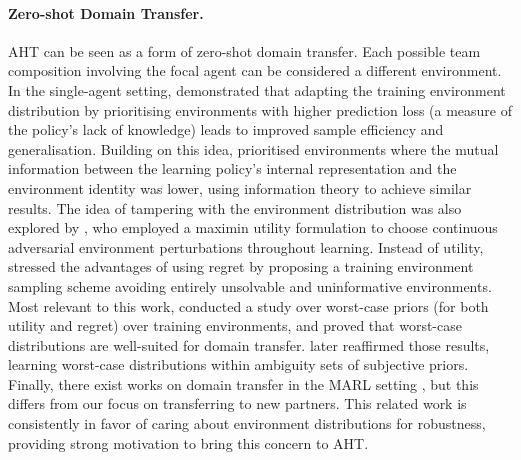 \paragraph{Zero-shot Domain Transfer.}
AHT can be seen as a form of zero-shot domain transfer. Each possible team composition involving the focal agent can be considered a different environment. In the single-agent setting, \citet{jiang_prioritized_level_replay_2021} demonstrated that adapting the training environment distribution by prioritising environments with higher prediction loss (a measure of the policy's lack of knowledge) leads to improved sample efficiency and generalisation. Building on this idea, \citet{garcin_how_level_sampling_2023} prioritised environments where the mutual information between the learning policy's internal representation and the environment identity was lower, using information theory to achieve similar results. The idea of tampering with the environment distribution was also explored by \citet{pinto_robust_adversarial_reinforcement_2017}, who employed a maximin utility formulation to choose continuous adversarial environment perturbations throughout learning. Instead of utility, \citet{dennis_emergent_complexity_zero_2020} stressed the advantages of using regret by proposing a training environment sampling scheme avoiding entirely unsolvable and uninformative environments. Most relevant to this work,  \citet{buening_minimax_bayes_reinforcement_2023} conducted a study over worst-case priors (for both utility and regret) over training environments, and proved that worst-case distributions are well-suited for domain transfer. \citet{li_bayes_optimal_robust_2024} later reaffirmed those results, learning worst-case distributions within ambiguity sets of subjective priors. Finally, there exist works on domain transfer in the MARL setting \citep{schafer_task_generalisation_multi_2022}, but this differs from our focus on transferring to new partners. This related work is consistently in favor of caring about environment distributions for robustness, providing strong motivation to bring this concern to AHT. 
